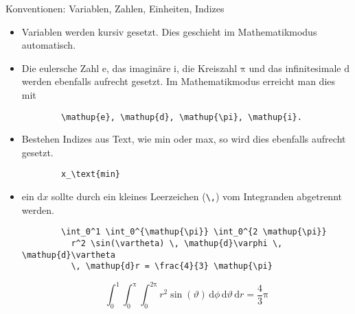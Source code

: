 \begin{frame}[fragile]{Konventionen: Variablen, Zahlen, Einheiten, Indizes}
  \begin{itemize}
    \item Variablen werden kursiv gesetzt.
      Dies geschieht im Mathematikmodus automatisch.
    \item Die eulersche Zahl $\mathup{e}$, das imaginäre $\mathup{i}$, die Kreiszahl $\mathup{\pi}$ und das infinitesimale $\mathup{d}$ werden ebenfalls aufrecht gesetzt.
      Im Mathematikmodus erreicht man dies mit
      \begin{lstlisting}
        \mathup{e}, \mathup{d}, \mathup{\pi}, \mathup{i}.
      \end{lstlisting}
    \item Bestehen Indizes aus Text, wie min oder max, so wird dies ebenfalls aufrecht gesetzt.
      \begin{lstlisting}
        x_\text{min}
      \end{lstlisting}
    \item ein $\mathrm{d}x$ sollte durch ein kleines Leerzeichen (\verb+\,+) vom Integranden abgetrennt werden.

      \vspace{5pt}
      \begin{lstlisting}
        \int_0^1 \int_0^{\mathup{\pi}} \int_0^{2 \mathup{\pi}}
          r^2 \sin(\vartheta) \, \mathup{d}\varphi \, \mathup{d}\vartheta
          \, \mathup{d}r = \frac{4}{3} \mathup{\pi}
      \end{lstlisting}

      \begin{equation*}
        \int_0^1 \int_0^{\mathup{\pi}} \int_0^{2 \mathup{\pi}} r^2 \sin(\vartheta) \, \mathup{d}\phi \, \mathup{d}\vartheta \, \mathup{d}r = \frac{4}{3} \mathup{\pi}
      \end{equation*}
  \end{itemize}
\end{frame}
